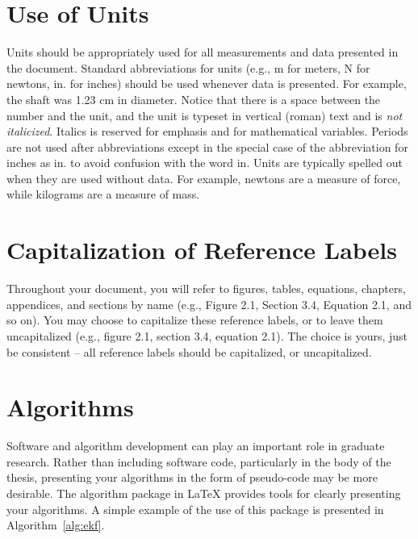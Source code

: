 \section{Use of Units}
Units should be appropriately used for all measurements and data presented in the document. Standard abbreviations for units (e.g., m for meters, N for newtons, in. for inches) should be used whenever data is presented. For example, the shaft was 1.23 cm in diameter. Notice that there is a space between the number and the unit, and the unit is typeset in vertical (roman) text and is {\em not italicized}. Italics is reserved for emphasis and for mathematical variables. Periods are not used after abbreviations except in the special case of the abbreviation for inches as in. to avoid confusion with the word in. Units are typically spelled out when they are used without data. For example, newtons are a measure of force, while kilograms are a measure of mass.

\section{Capitalization of Reference Labels}
Throughout your document, you will refer to figures, tables, equations, chapters, appendices, and sections by name (e.g., Figure 2.1, Section 3.4, Equation 2.1, and so on). You may choose to capitalize these reference labels, or to leave them uncapitalized (e.g., figure 2.1, section 3.4, equation 2.1). The choice is yours, just be consistent -- all reference labels should be capitalized, or uncapitalized.

\section{Algorithms}
Software and algorithm development can play an important role in graduate research. Rather than including software code, particularly in the body of the thesis, presenting your algorithms in the form of pseudo-code may be more desirable. The {\ttfamily algorithm} package in \LaTeX{} provides tools for clearly presenting your algorithms. A simple example of the use of this package is presented in Algorithm~\ref{alg:ekf}.


